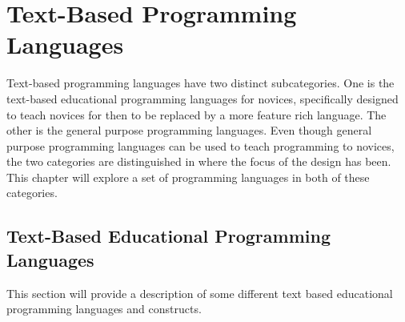 \section{Text-Based Programming Languages}
\label{sec:text_based_programming_languages}

Text-based programming languages have two distinct subcategories. One is the text-based educational programming languages for novices, specifically designed to teach novices for then to be replaced by a more feature rich language. The other is the general purpose programming languages. Even though general purpose programming languages can be used to teach programming to novices, the two categories are distinguished in where the focus of the design has been. This chapter will explore a set of programming languages in both of these categories.

\subsection{Text-Based Educational Programming Languages}
This section will provide a description of some different text based educational programming languages and constructs.


